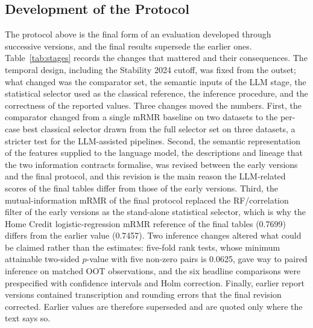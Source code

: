 \documentclass[final,5p,twocolumn]{elsarticle}
\begin{document}
\subsection{Development of the Protocol}
\label{subsec:protocol_development}

The protocol above is the final form of an evaluation developed through successive versions, and the final results supersede the earlier ones. Table~\ref{tab:stages} records the changes that mattered and their consequences. The temporal design, including the Stability 2024 cutoff, was fixed from the outset; what changed was the comparator set, the semantic inputs of the LLM stage, the statistical selector used as the classical reference, the inference procedure, and the correctness of the reported values. Three changes moved the numbers. First, the comparator changed from a single mRMR baseline on two datasets to the per-case best classical selector drawn from the full selector set on three datasets, a stricter test for the LLM-assisted pipelines. Second, the semantic representation of the features supplied to the language model, the descriptions and lineage that the two information contracts formalise, was revised between the early versions and the final protocol, and this revision is the main reason the LLM-related scores of the final tables differ from those of the early versions. Third, the mutual-information mRMR of the final protocol replaced the RF/correlation filter of the early versions as the stand-alone statistical selector, which is why the Home Credit logistic-regression mRMR reference of the final tables (0.7699) differs from the earlier value (0.7457). Two inference changes altered what could be claimed rather than the estimates: five-fold rank tests, whose minimum attainable two-sided $p$-value with five non-zero pairs is 0.0625, gave way to paired inference on matched OOT observations, and the six headline comparisons were prespecified with confidence intervals and Holm correction. Finally, earlier report versions contained transcription and rounding errors that the final revision corrected. Earlier values are therefore superseded and are quoted only where the text says so.
\end{document}
